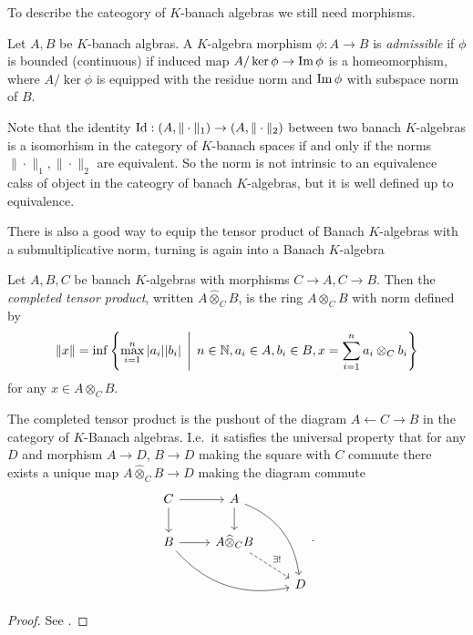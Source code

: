 To describe the cateogory of $K$-banach algebras we still need morphisms.
\begin{definition}
	Let $A, B$ be $K$-banach algbras. 
	A $K$-algebra morphism $\phi: A \to B$ is \emph{admissible} if $\phi$ is bounded (continuous) if induced map $A / \ker \phi \to \operatorname{Im} \phi$ is a homeomorphism, where $A / \ker \phi$ is equipped with the residue norm and $\operatorname{Im} \phi$ with subspace norm of $B$. 
\end{definition}

\begin{remark}\label{rem:uniqueness_norm_banach_algebra}
	Note that the identity  $\operatorname{Id}: (A, \|\cdot \|_1) \to (A, \|\cdot \|_2)$ between two banach $K$-algebras is a isomorhism in the category of $K$-banach spaces if and only if the norms $\|\cdot \|_1, \|\cdot \|_2$ are equivalent. 
	So the norm is not intrinsic to an equivalence calss of object in the cateogry of banach  $K$-algebras, but it is well defined up to equivalence. 
\end{remark}

There is also a good way to equip the tensor product of Banach $K$-algebras with a submultiplicative norm, turning is again into a Banach $K$-algebra
\begin{definition}
	Let $A, B, C$ be banach $K$-algebras with morphisms  $C\to A, C \to B$. Then the \emph{completed tensor product}, written $A \widehat \otimes_C B$, is the ring $A \otimes_C B$ with norm defined by \[
		\|x\| = \inf \left\{\max_{i = 1}^{n} |a_i||b_i|  \st n \in \N, a_i \in A, b_i \in B, x = \sum_{i = 1}^{n} a_i \otimes_C b_i\right\} 
	\] 
	for any $x \in A \otimes_C B$. 
\end{definition}

\begin{proposition}\label{prop:universal_prop_complete_tensor}
	The completed tensor product is the pushout of the diagram $A \leftarrow C \to B$ in the category of  $K$-Banach algebras. I.e.\ it satisfies the universal property that for any  $D$ and morphism $A \to D$,  $B \to D$ making the square with $C$ commute there exists a unique map $A \widehat\otimes_C B \to D$ making the diagram commute\[
	\begin{tikzcd}
		C \rar \dar & A \dar \ar[bend left]{rdd} \\
		B \rar \ar[bend right]{drr} &  A \widehat{\otimes}_C B \ar[dashed]{dr}{\exists !} \\
		 & & D
	\end{tikzcd}
	.\] 
\end{proposition}
\begin{proof}
	See \cite[][section 2.1.7]{siegfriedboschNonArchimedeanAnalysisSystematic1984}. 
\end{proof}


